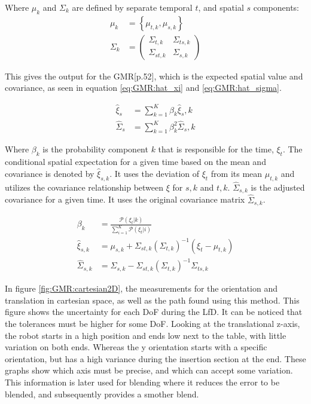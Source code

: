 Where $\mu_k$ and $\Sigma_k$ are defined by separate temporal $t$, and spatial $s$ components:
\begin{align}
    \mu_k &= \left\{ \mu_{t, k}, \mu_{s, k} \right\} \\
    \Sigma_k &= \begin{pmatrix}
                    \Sigma_{t,k} & \Sigma_{ts,k} \\
                    \Sigma_{st,k} & \Sigma_{s,k}
                \end{pmatrix}
\end{align}

This gives the output for the GMR\cite{SelfStudy}[p.52], which is the expected spatial value and covariance, as seen in equation \ref{eq:GMR:hat_xi} and \ref{eq:GMR:hat_sigma}.

\begin{align}
    \hat{\xi}_s &= \sum_{k=1}^{K} \beta_k \hat{\xi}_s, k \label{eq:GMR:hat_xi} \\
    \hat{\Sigma}_s &= \sum_{k=1}^{K} \beta_k^2 \hat{\Sigma}_s, k \label{eq:GMR:hat_sigma}
\end{align}

Where $\beta_k$ is the probability component $k$ that is responsible for the time, $\xi_t$.
The conditional spatial expectation for a given time based on the mean and covariance is denoted by $\hat{\xi}_{s,k}$. It uses the deviation of $\xi_t$ from its mean $\mu_{t,k}$ and utilizes the covariance relationship between $\xi$ for $s,k$ and $t,k$.
$\hat{\Sigma}_{s,k}$ is the adjusted covariance for a given time. It uses the original covariance matrix $\hat{\Sigma}_{s,k}$. 

\begin{align}
    \beta_k &= \frac{\mathcal{P} (\xi_t | k)}{\sum_{i=1}^{K} \mathcal{P} (\xi_t | i)} \\
    \hat{\xi}_{s,k} &= \mu_{s,k} + \Sigma_{st,k} (\Sigma_{t,k})^{-1} (\xi_t - \mu_{t,k}) \\
    \hat{\Sigma}_{s,k} &= \Sigma_{s,k} - \Sigma_{st,k} (\Sigma_{t,k})^{-1}  \Sigma_{ts,k}
\end{align}

In figure \ref{fig:GMR:cartesian2D}, the measurements for the orientation and translation in cartesian space, as well as the path found using this method. 
This figure shows the uncertainty for each DoF during the LfD. It can be noticed that the tolerances must be higher for some DoF.
Looking at the translational z-axis, the robot starts in a high position and ends low next to the table, with little variation on both ends.
Whereas the y orientation starts with a specific orientation, but has a high variance during the insertion section at the end.
These graphs show which axis must be precise, and which can accept some variation. 
This information is later used for blending where it reduces the error to be blended, and subsequently provides a smother blend.

